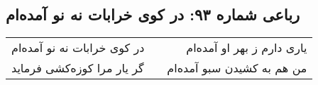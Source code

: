 \begin{center}
\section*{رباعی شماره ۹۳: در کوی خرابات نه نو آمده‌ام}
\label{sec:093}
\begin{longtable}{l p{0.5cm} r}
در کوی خرابات نه نو آمده‌ام
&&
یاری دارم ز بهر او آمده‌ام
\\
گر یار مرا کوزه‌کشی فرماید
&&
من هم به کشیدن سبو آمده‌ام
\\
\end{longtable}
\end{center}
